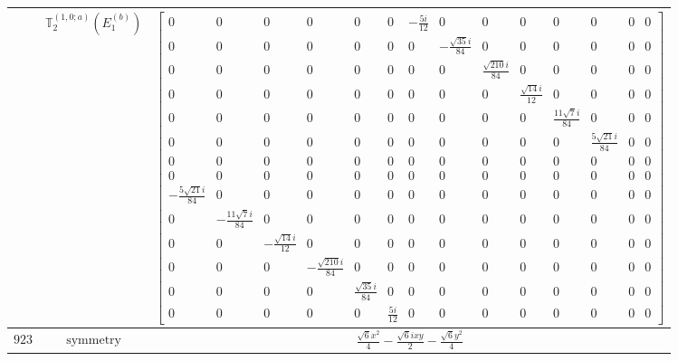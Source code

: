 \documentclass[fleqn,8pt,landscape]{jsarticle}
\begin{document}
\begin{longtable}{ccc}
$  $ & $ \mathbb{T}_{2}^{(1,0;a)}(E_{1}^{(b)}) $ & $ \begin{bmatrix} 0 & 0 & 0 & 0 & 0 & 0 & - \frac{5 i}{12} & 0 & 0 & 0 & 0 & 0 & 0 & 0 \\ 0 & 0 & 0 & 0 & 0 & 0 & 0 & - \frac{\sqrt{35} i}{84} & 0 & 0 & 0 & 0 & 0 & 0 \\ 0 & 0 & 0 & 0 & 0 & 0 & 0 & 0 & \frac{\sqrt{210} i}{84} & 0 & 0 & 0 & 0 & 0 \\ 0 & 0 & 0 & 0 & 0 & 0 & 0 & 0 & 0 & \frac{\sqrt{14} i}{12} & 0 & 0 & 0 & 0 \\ 0 & 0 & 0 & 0 & 0 & 0 & 0 & 0 & 0 & 0 & \frac{11 \sqrt{7} i}{84} & 0 & 0 & 0 \\ 0 & 0 & 0 & 0 & 0 & 0 & 0 & 0 & 0 & 0 & 0 & \frac{5 \sqrt{21} i}{84} & 0 & 0 \\ 0 & 0 & 0 & 0 & 0 & 0 & 0 & 0 & 0 & 0 & 0 & 0 & 0 & 0 \\ 0 & 0 & 0 & 0 & 0 & 0 & 0 & 0 & 0 & 0 & 0 & 0 & 0 & 0 \\ - \frac{5 \sqrt{21} i}{84} & 0 & 0 & 0 & 0 & 0 & 0 & 0 & 0 & 0 & 0 & 0 & 0 & 0 \\ 0 & - \frac{11 \sqrt{7} i}{84} & 0 & 0 & 0 & 0 & 0 & 0 & 0 & 0 & 0 & 0 & 0 & 0 \\ 0 & 0 & - \frac{\sqrt{14} i}{12} & 0 & 0 & 0 & 0 & 0 & 0 & 0 & 0 & 0 & 0 & 0 \\ 0 & 0 & 0 & - \frac{\sqrt{210} i}{84} & 0 & 0 & 0 & 0 & 0 & 0 & 0 & 0 & 0 & 0 \\ 0 & 0 & 0 & 0 & \frac{\sqrt{35} i}{84} & 0 & 0 & 0 & 0 & 0 & 0 & 0 & 0 & 0 \\ 0 & 0 & 0 & 0 & 0 & \frac{5 i}{12} & 0 & 0 & 0 & 0 & 0 & 0 & 0 & 0 \end{bmatrix} $ \\ \hline
$ 923 $ & $ \text{symmetry} $ & $ \frac{\sqrt{6} x^{2}}{4} - \frac{\sqrt{6} i x y}{2} - \frac{\sqrt{6} y^{2}}{4} $ \\

\end{longtable}
\end{document}
